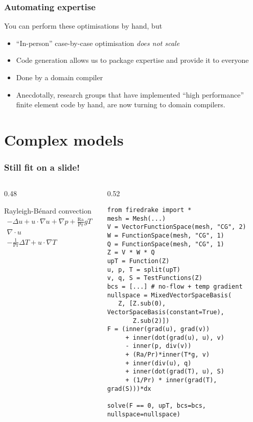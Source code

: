 \documentclass[presentation]{beamer}
\begin{document}
\begin{frame}
  \frametitle{Automating expertise}
  You can perform these optimisations by hand, but
  
  \begin{itemize}
  \item ``In-person'' case-by-case optimisation \emph{does not scale}
  \item Code generation allows us to package expertise and provide it
    to everyone
  \item Done by a domain compiler
  \item Anecdotally, research groups that have implemented ``high
    performance'' finite element code by hand, are now turning to
    domain compilers.
  \end{itemize}
\end{frame}

\section{Complex models}

\begin{frame}[fragile]
  \frametitle{Still fit on a slide!}
  \begin{columns}
    \begin{column}{0.48\framewidth}
      \begin{block}{Rayleigh-B\'enard convection}
        \small
        \begin{equation*}
          \begin{split}
            -\Delta u + u\cdot\nabla u + \nabla p +
            \frac{\text{Ra}}{\text{Pr}} \hat{g}T &= 0 \\
            \nabla \cdot u &= 0 \\
            - \frac{1}{\text{Pr}} \Delta T + u\cdot \nabla T &= 0
          \end{split}
        \end{equation*}
      \end{block}
    \end{column}
    \begin{column}{0.52\framewidth}
\begin{verbatim}
from firedrake import *
mesh = Mesh(...)
V = VectorFunctionSpace(mesh, "CG", 2)
W = FunctionSpace(mesh, "CG", 1)
Q = FunctionSpace(mesh, "CG", 1)
Z = V * W * Q
upT = Function(Z)
u, p, T = split(upT)
v, q, S = TestFunctions(Z)
bcs = [...] # no-flow + temp gradient
nullspace = MixedVectorSpaceBasis(
   Z, [Z.sub(0), VectorSpaceBasis(constant=True), 
       Z.sub(2)])
F = (inner(grad(u), grad(v))
     + inner(dot(grad(u), u), v)
     - inner(p, div(v))
     + (Ra/Pr)*inner(T*g, v)
     + inner(div(u), q)
     + inner(dot(grad(T), u), S)
     + (1/Pr) * inner(grad(T), grad(S)))*dx

solve(F == 0, upT, bcs=bcs, nullspace=nullspace)
\end{verbatim}
    \end{column}
  \end{columns}
\end{frame}
\end{document}
